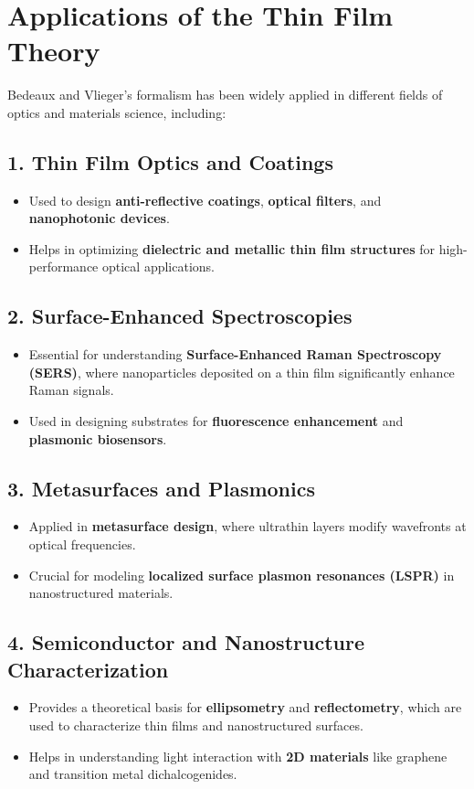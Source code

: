 \documentclass{article}
\begin{document}
		\section*{Applications of the Thin Film Theory}
		Bedeaux and Vlieger’s formalism has been widely applied in different fields of optics and materials science, including:
		
		\subsection*{1. Thin Film Optics and Coatings}
		\begin{itemize}
			\item Used to design \textbf{anti-reflective coatings}, \textbf{optical filters}, and \textbf{nanophotonic devices}.
			\item Helps in optimizing \textbf{dielectric and metallic thin film structures} for high-performance optical applications.
		\end{itemize}
		
		\subsection*{2. Surface-Enhanced Spectroscopies}
		\begin{itemize}
			\item Essential for understanding \textbf{Surface-Enhanced Raman Spectroscopy (SERS)}, where nanoparticles deposited on a thin film significantly enhance Raman signals.
			\item Used in designing substrates for \textbf{fluorescence enhancement} and \textbf{plasmonic biosensors}.
		\end{itemize}
		
		\subsection*{3. Metasurfaces and Plasmonics}
		\begin{itemize}
			\item Applied in \textbf{metasurface design}, where ultrathin layers modify wavefronts at optical frequencies.
			\item Crucial for modeling \textbf{localized surface plasmon resonances (LSPR)} in nanostructured materials.
		\end{itemize}
		
		\subsection*{4. Semiconductor and Nanostructure Characterization}
		\begin{itemize}
			\item Provides a theoretical basis for \textbf{ellipsometry} and \textbf{reflectometry}, which are used to characterize thin films and nanostructured surfaces.
			\item Helps in understanding light interaction with \textbf{2D materials} like graphene and transition metal dichalcogenides.
		\end{itemize}
		
\end{document}
